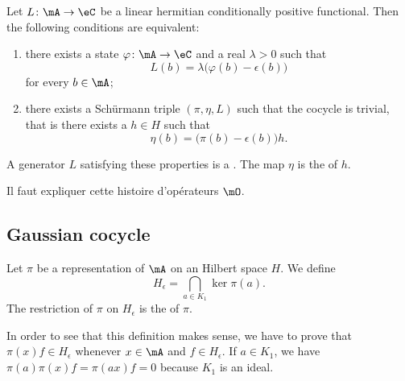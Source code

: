 \begin{proposition}     \label{PropDefPoissonnL}
    Let $L\colon \mA\to \eC$ be a linear hermitian conditionally positive functional. Then the following conditions are equivalent:
    \begin{enumerate}
        \item
            there exists a state $\varphi\colon \mA\to \eC$ and a real $\lambda>0$ such that
            \begin{equation}
                L(b)=\lambda\big( \varphi(b)-\epsilon(b) \big)
            \end{equation}
            for every $b\in\mA$;
        \item
            there exists a Schürmann triple $(\pi,\eta,L)$ such that the cocycle is trivial, that is there exists a $h\in H$ such that
            \begin{equation}
                \eta(b)=\big( \pi(b)-\epsilon(b) \big)h.
            \end{equation}
    \end{enumerate}
\end{proposition}
A generator $L$ satisfying these properties is a . The map $\eta$ is the  of $h$.

\begin{probleme}
    Il faut expliquer cette histoire d'opérateurs $\mO$.
\end{probleme}

\subsection{Gaussian cocycle}

\begin{definition}
    Let $\pi$ be a representation of $\mA$ on an Hilbert space $H$. We define
    \begin{equation}
        H_{\epsilon}=\bigcap_{a\in K_1}\ker\pi(a).
    \end{equation}
    The restriction of $\pi$ on $H_{\epsilon}$ is the  of $\pi$.
\end{definition}
In order to see that this definition makes sense, we have to prove that $\pi(x)f\in H_{\epsilon}$ whenever $x\in\mA$ and $f\in H_{\epsilon}$. If $a\in K_1$, we have $\pi(a)\pi(x)f=\pi(ax)f=0$ because $K_1$ is an ideal.

